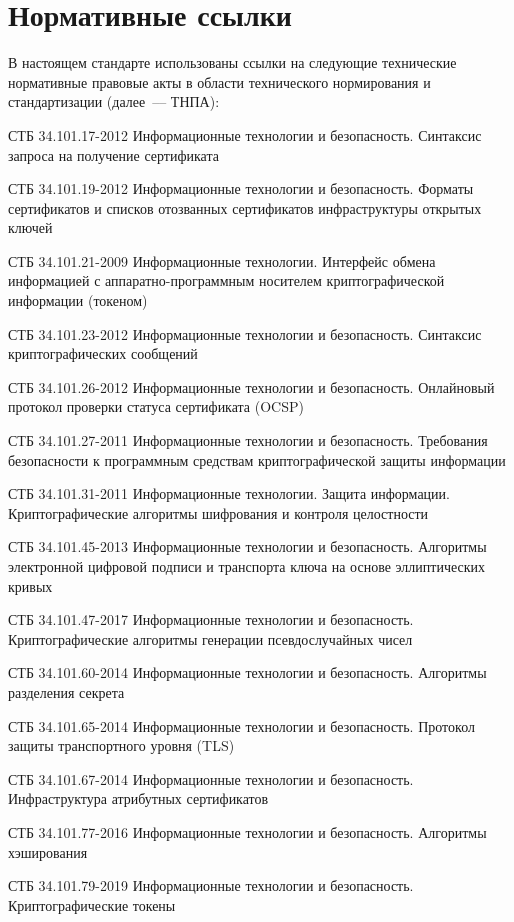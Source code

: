 \chapter{Нормативные ссылки}

В настоящем стандарте использованы ссылки на следующие технические 
нормативные правовые акты в области технического нормирования и 
стандартизации (далее~--– ТНПА): 
 
СТБ 34.101.17-2012 Информационные технологии и безопасность. Синтаксис 
запроса на получение сертификата

СТБ 34.101.19-2012 Информационные технологии и безопасность. Форматы 
сертификатов и списков отозванных сертификатов инфраструктуры открытых 
ключей 

СТБ 34.101.21-2009 Информационные технологии. Интерфейс обмена информацией
с аппаратно-программным носителем криптографической информации (токеном)

СТБ 34.101.23-2012 Информационные технологии и безопасность. Синтаксис 
криптографических сообщений

СТБ 34.101.26-2012 Информационные технологии и безопасность. Онлайновый 
протокол проверки статуса сертификата (OCSP)

СТБ 34.101.27-2011 Информационные технологии и безопасность. Требования 
безопасности к программным средствам криптографической защиты информации 

СТБ 34.101.31-2011 Информационные технологии. Защита информации. 
Криптографические алгоритмы шифрования и контроля целостности

СТБ 34.101.45-2013 Информационные технологии и безопасность. 
Алгоритмы электронной цифровой подписи и транспорта ключа на основе 
эллиптических кривых

СТБ 34.101.47-2017 Информационные технологии и безопасность. 
Криптографические алгоритмы генерации псевдослучайных чисел 

СТБ 34.101.60-2014 Информационные технологии и безопасность. 
Алгоритмы разделения секрета

СТБ 34.101.65-2014 Информационные технологии и безопасность. 
Протокол защиты транспортного уровня (TLS)

СТБ 34.101.67-2014 Информационные технологии и безопасность. 
Инфраструктура атрибутных сертификатов 

СТБ 34.101.77-2016 Информационные технологии и безопасность. 
Алгоритмы хэширования

СТБ 34.101.79-2019 
Информационные технологии и безопасность. Криптографические токены

